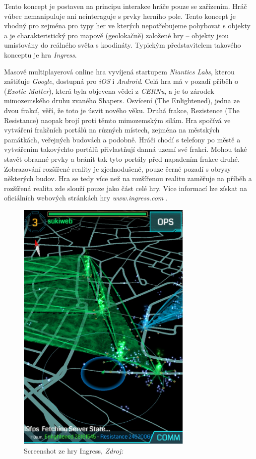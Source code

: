 \documentclass[twoside,12pt]{article}
\begin{document}
Tento koncept je postaven na principu interakce hráče pouze se zařízením. Hráč vůbec nemanipuluje ani neinteraguje s prvky herního pole. Tento koncept je vhodný pro zejména pro typy her ve kterých nepotřebujeme pohybovat s objekty a je charakteristický pro mapově (geolokačně) založené hry -- objekty jsou umisťovány do reálného světa s koodináty. Typickým představitelem takového konceptu je hra \textit{Ingress}.

%
% 

Masově multiplayerová online hra vyvíjená startupem \textit{Niantics Labs}, kterou zaštiťuje \textit{Google}, dostupná pro \textit{iOS} i \textit{Android}. Celá hra má v pozadí příběh o  (\textit{Exotic Matter}), která byla objevena vědci z \textit{CERNu}, a je to zárodek mimozemského druhu zvaného Shapers. Osvícení (The Enlightened), jedna ze dvou frakcí, věří, že toto je úsvit nového věku. Druhá frakce, Rezistence (The Resistance) naopak brojí proti těmto mimozemským silám. Hra spočívá ve vytváření frakčních portálů na různých místech, zejména na městských památkách, veřejných budovách a podobně. Hráči chodí s telefony po městě a vytvářením takovýchto portálů přivlastňují danná uzemí své frakci. Mohou také stavět obranné prvky a bránit tak tyto portály před napadením frakce druhé. Zobrazování rozšířené reality je zjednodušené, pouze černé pozadí s obrysy některých budov. Hra se tedy více než na rozšířenou realitu zaměřuje na příběh a rozšířená realita zde slouží pouze jako část celé hry. Více informací lze získat na oficiálních webových stránkách hry \textit{www.ingress.com} \cite{ingress}.


\begin{figure}[H]
    \centering
    \includegraphics[width=320px, center]{images/ingress.jpg}
    \caption[ingress_screenshot]{Screenshot ze hry Ingress, \textit{Zdroj: \cite{ingress_screenshot}}}
    \label{ingress_screenshot}
\end{figure}
\end{document}
